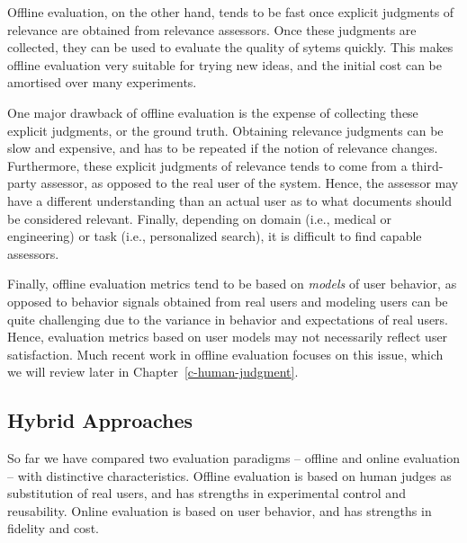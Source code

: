 Offline evaluation, on the other hand, tends to be fast once explicit judgments of relevance are obtained from relevance assessors. Once these judgments are collected, they can be used to evaluate the quality of sytems quickly. This makes offline evaluation very suitable for trying new ideas, and the initial cost can be amortised over many experiments. %

One major drawback of offline evaluation is the expense of collecting these explicit judgments, or the ground truth. Obtaining relevance judgments can be slow and expensive, and has to be repeated if the notion of relevance changes. Furthermore, these explicit judgments of relevance tends to come from a third-party assessor, as opposed to the real user of the system. Hence, the assessor may have a different understanding than an actual user as to what documents should be considered relevant. Finally, depending on domain (i.e., medical or engineering) or task (i.e., personalized search), it is difficult to find capable assessors. 

Finally, offline evaluation metrics tend to be based on \emph{models} of user behavior, as opposed to behavior signals obtained from real users and modeling users can be quite challenging due to the variance in behavior and expectations of real users. Hence, evaluation metrics based on user models may not necessarily reflect user satisfaction. Much recent work in offline evaluation focuses on this issue, which we will review later in Chapter~\ref{c-human-judgment}. %


\subsection{Hybrid Approaches}

So far we have compared two evaluation paradigms -- offline and online evaluation -- with distinctive characteristics. Offline evaluation is based on human judges as substitution of real users, and has strengths in experimental control and reusability. Online evaluation is based on user behavior, and has strengths in fidelity and cost.


